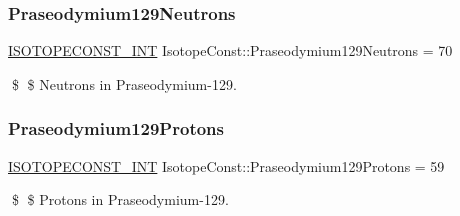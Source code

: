 \subsubsection{\texorpdfstring{Praseodymium129\+Neutrons}{Praseodymium129Neutrons}}
{\footnotesize\ttfamily \mbox{\hyperlink{group___isotope_const-_macros_ga5f18360b3e99483a35c32d789e62621c}{I\+S\+O\+T\+O\+P\+E\+C\+O\+N\+S\+T\+\_\+\+I\+NT}} Isotope\+Const\+::\+Praseodymium129\+Neutrons = 70}

\$ \$ Neutrons in Praseodymium-\/129. \mbox{\label{group___isotope_const-_praseodymium-_pr129_ga3b757f3b01ae5c8d3f59327268e50532}} 
\subsubsection{\texorpdfstring{Praseodymium129\+Protons}{Praseodymium129Protons}}
{\footnotesize\ttfamily \mbox{\hyperlink{group___isotope_const-_macros_ga5f18360b3e99483a35c32d789e62621c}{I\+S\+O\+T\+O\+P\+E\+C\+O\+N\+S\+T\+\_\+\+I\+NT}} Isotope\+Const\+::\+Praseodymium129\+Protons = 59}

\$ \$ Protons in Praseodymium-\/129. 